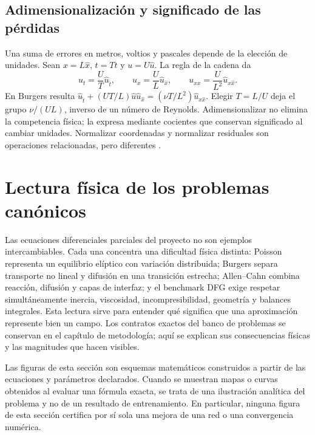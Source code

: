 \subsection{Adimensionalización y significado de las pérdidas}
Una suma de errores en metros, voltios y pascales depende de la elección de unidades. Sean $x=L\hat x$, $t=T\hat t$ y $u=U\hat u$. La regla de la cadena da
\begin{equation}
u_t=\frac UT\hat u_{\hat t},\qquad
u_x=\frac UL\hat u_{\hat x},\qquad
u_{xx}=\frac U{L^2}\hat u_{\hat x\hat x}.
\label{eq:escalas}
\end{equation}
En Burgers resulta $\hat u_{\hat t}+(UT/L)\hat u\hat u_{\hat x}=(\nu T/L^2)\hat u_{\hat x\hat x}$. Elegir $T=L/U$ deja el grupo $\nu/(UL)$, inverso de un número de Reynolds. Adimensionalizar no elimina la competencia física; la expresa mediante cocientes que conservan significado al cambiar unidades. Normalizar coordenadas y normalizar residuales son operaciones relacionadas, pero diferentes \cite{wang2023expertguide}.


\section{Lectura física de los problemas canónicos}
\label{sec:lectura-fisica-pdes}

Las ecuaciones diferenciales parciales del proyecto no son ejemplos
intercambiables. Cada una concentra una dificultad física distinta: Poisson
representa un equilibrio elíptico con variación distribuida; Burgers separa
transporte no lineal y difusión en una transición estrecha; Allen--Cahn
combina reacción, difusión y capas de interfaz; y el benchmark DFG exige
respetar simultáneamente inercia, viscosidad, incompresibilidad, geometría y
balances integrales. Esta lectura sirve para entender qué significa que una
aproximación represente bien un campo. Los contratos exactos del banco de
problemas se conservan en el capítulo de metodología; aquí se explican sus
consecuencias físicas y las magnitudes que hacen visibles.

Las figuras de esta sección son esquemas matemáticos construidos a partir de
las ecuaciones y parámetros declarados. Cuando se muestran mapas o curvas
obtenidos al evaluar una fórmula exacta, se trata de una ilustración analítica
del problema y no de un resultado de entrenamiento. En particular, ninguna
figura de esta sección certifica por sí sola una mejora de una red o una
convergencia numérica.

